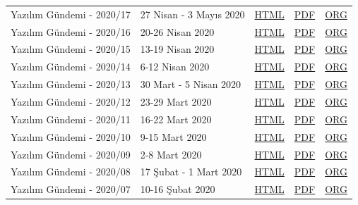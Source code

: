 \documentclass[11pt]{article}
\begin{document}
\begin{center}
\begin{tabular}{lllll}
Yazılım Gündemi - 2020/17 & 27 Nisan - 3 Mayıs 2020 & \href{arsiv/2020/17/yazilim-gundemi-2020-17.html}{HTML} & \href{arsiv/2020/17/yazilim-gundemi-2020-17.pdf}{PDF} & \href{arsiv/2020/17/yazilim-gundemi-2020-17.pdf}{ORG}\\
Yazılım Gündemi - 2020/16 & 20-26 Nisan 2020 & \href{arsiv/2020/16/yazilim-gundemi-2020-16.html}{HTML} & \href{arsiv/2020/16/yazilim-gundemi-2020-16.pdf}{PDF} & \href{arsiv/2020/16/yazilim-gundemi-2020-16.pdf}{ORG}\\
Yazılım Gündemi - 2020/15 & 13-19 Nisan 2020 & \href{arsiv/2020/15/yazilim-gundemi-2020-15.html}{HTML} & \href{arsiv/2020/15/yazilim-gundemi-2020-15.pdf}{PDF} & \href{arsiv/2020/15/yazilim-gundemi-2020-15.pdf}{ORG}\\
Yazılım Gündemi - 2020/14 & 6-12 Nisan 2020 & \href{arsiv/2020/14/yazilim-gundemi-2020-14.html}{HTML} & \href{arsiv/2020/14/yazilim-gundemi-2020-14.pdf}{PDF} & \href{arsiv/2020/14/yazilim-gundemi-2020-14.pdf}{ORG}\\
Yazılım Gündemi - 2020/13 & 30 Mart - 5 Nisan 2020 & \href{arsiv/2020/13/yazilim-gundemi-2020-13.html}{HTML} & \href{arsiv/2020/13/yazilim-gundemi-2020-13.pdf}{PDF} & \href{arsiv/2020/13/yazilim-gundemi-2020-13.pdf}{ORG}\\
Yazılım Gündemi - 2020/12 & 23-29 Mart 2020 & \href{arsiv/2020/12/yazilim-gundemi-2020-12.html}{HTML} & \href{arsiv/2020/12/yazilim-gundemi-2020-12.pdf}{PDF} & \href{arsiv/2020/12/yazilim-gundemi-2020-12.pdf}{ORG}\\
Yazılım Gündemi - 2020/11 & 16-22 Mart 2020 & \href{arsiv/2020/11/yazilim-gundemi-2020-11.html}{HTML} & \href{arsiv/2020/11/yazilim-gundemi-2020-11.pdf}{PDF} & \href{arsiv/2020/11/yazilim-gundemi-2020-11.pdf}{ORG}\\
Yazılım Gündemi - 2020/10 & 9-15 Mart 2020 & \href{arsiv/2020/10/yazilim-gundemi-2020-10.html}{HTML} & \href{arsiv/2020/10/yazilim-gundemi-2020-10.pdf}{PDF} & \href{arsiv/2020/10/yazilim-gundemi-2020-10.pdf}{ORG}\\
Yazılım Gündemi - 2020/09 & 2-8 Mart 2020 & \href{arsiv/2020/09/yazilim-gundemi-2020-09.html}{HTML} & \href{arsiv/2020/09/yazilim-gundemi-2020-09.pdf}{PDF} & \href{arsiv/2020/09/yazilim-gundemi-2020-09.pdf}{ORG}\\
Yazılım Gündemi - 2020/08 & 17 Şubat - 1 Mart 2020 & \href{arsiv/2020/08/yazilim-gundemi-2020-08.html}{HTML} & \href{arsiv/2020/08/yazilim-gundemi-2020-08.pdf}{PDF} & \href{arsiv/2020/08/yazilim-gundemi-2020-08.pdf}{ORG}\\
Yazılım Gündemi - 2020/07 & 10-16 Şubat 2020 & \href{arsiv/2020/07/yazilim-gundemi-2020-07.html}{HTML} & \href{arsiv/2020/07/yazilim-gundemi-2020-07.pdf}{PDF} & \href{arsiv/2020/07/yazilim-gundemi-2020-07.pdf}{ORG}\\

\end{tabular}
\end{center}
\end{document}
